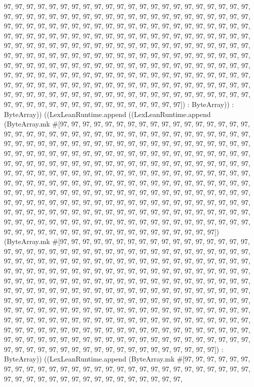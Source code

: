 \documentclass[11pt]{article}
\begin{document}
97, 97, 97, 97, 97, 97, 97, 97, 97, 97, 97, 97, 97, 97, 97, 97, 97, 97, 97, 97, 97, 97, 97, 97, 97, 97, 97, 97, 97, 97, 97, 97, 97, 97, 97, 97, 97, 97, 97, 97, 97, 97, 97, 97, 97, 97, 97, 97, 97, 97, 97, 97, 97, 97, 97, 97, 97, 97, 97, 97, 97, 97, 97, 97, 97, 97, 97, 97, 97, 97, 97, 97, 97, 97, 97, 97, 97, 97, 97, 97, 97, 97, 97, 97, 97, 97, 97, 97, 97, 97, 97, 97, 97, 97, 97, 97, 97, 97, 97, 97, 97, 97, 97, 97, 97, 97, 97, 97, 97, 97, 97, 97, 97, 97, 97, 97, 97, 97, 97, 97, 97, 97, 97, 97, 97, 97, 97, 97, 97, 97, 97, 97, 97, 97, 97, 97, 97, 97, 97, 97, 97, 97, 97, 97, 97, 97, 97, 97, 97, 97, 97, 97, 97, 97, 97, 97, 97, 97, 97, 97, 97, 97, 97, 97, 97, 97, 97, 97, 97, 97, 97, 97, 97, 97, 97, 97, 97, 97, 97, 97, 97, 97, 97, 97, 97, 97, 97, 97, 97, 97, 97, 97, 97, 97, 97, 97, 97, 97, 97, 97, 97, 97, 97, 97, 97, 97, 97, 97, 97, 97, 97, 97, 97, 97, 97, 97, 97, 97, 97, 97, 97, 97, 97, 97, 97, 97, 97, 97, 97, 97, 97, 97, 97, 97, 97, 97]) : ByteArray)) : ByteArray)) ((LexLeanRuntime.append ((LexLeanRuntime.append (ByteArray.mk \#[97, 97, 97, 97, 97, 97, 97, 97, 97, 97, 97, 97, 97, 97, 97, 97, 97, 97, 97, 97, 97, 97, 97, 97, 97, 97, 97, 97, 97, 97, 97, 97, 97, 97, 97, 97, 97, 97, 97, 97, 97, 97, 97, 97, 97, 97, 97, 97, 97, 97, 97, 97, 97, 97, 97, 97, 97, 97, 97, 97, 97, 97, 97, 97, 97, 97, 97, 97, 97, 97, 97, 97, 97, 97, 97, 97, 97, 97, 97, 97, 97, 97, 97, 97, 97, 97, 97, 97, 97, 97, 97, 97, 97, 97, 97, 97, 97, 97, 97, 97, 97, 97, 97, 97, 97, 97, 97, 97, 97, 97, 97, 97, 97, 97, 97, 97, 97, 97, 97, 97, 97, 97, 97, 97, 97, 97, 97, 97, 97, 97, 97, 97, 97, 97, 97, 97, 97, 97, 97, 97, 97, 97, 97, 97, 97, 97, 97, 97, 97, 97, 97, 97, 97, 97, 97, 97, 97, 97, 97, 97, 97, 97, 97, 97, 97, 97, 97, 97, 97, 97, 97, 97, 97, 97, 97, 97, 97, 97, 97, 97, 97, 97, 97, 97, 97, 97, 97, 97, 97, 97, 97, 97, 97, 97, 97, 97, 97, 97, 97, 97, 97, 97, 97, 97, 97, 97, 97, 97, 97, 97, 97, 97, 97, 97, 97, 97, 97, 97, 97, 97, 97, 97, 97, 97, 97, 97, 97, 97, 97, 97, 97, 97, 97, 97, 97, 97, 97, 97, 97, 97, 97, 97, 97, 97, 97, 97, 97, 97, 97, 97, 97, 97, 97, 97, 97, 97]) (ByteArray.mk \#[97, 97, 97, 97, 97, 97, 97, 97, 97, 97, 97, 97, 97, 97, 97, 97, 97, 97, 97, 97, 97, 97, 97, 97, 97, 97, 97, 97, 97, 97, 97, 97, 97, 97, 97, 97, 97, 97, 97, 97, 97, 97, 97, 97, 97, 97, 97, 97, 97, 97, 97, 97, 97, 97, 97, 97, 97, 97, 97, 97, 97, 97, 97, 97, 97, 97, 97, 97, 97, 97, 97, 97, 97, 97, 97, 97, 97, 97, 97, 97, 97, 97, 97, 97, 97, 97, 97, 97, 97, 97, 97, 97, 97, 97, 97, 97, 97, 97, 97, 97, 97, 97, 97, 97, 97, 97, 97, 97, 97, 97, 97, 97, 97, 97, 97, 97, 97, 97, 97, 97, 97, 97, 97, 97, 97, 97, 97, 97, 97, 97, 97, 97, 97, 97, 97, 97, 97, 97, 97, 97, 97, 97, 97, 97, 97, 97, 97, 97, 97, 97, 97, 97, 97, 97, 97, 97, 97, 97, 97, 97, 97, 97, 97, 97, 97, 97, 97, 97, 97, 97, 97, 97, 97, 97, 97, 97, 97, 97, 97, 97, 97, 97, 97, 97, 97, 97, 97, 97, 97, 97, 97, 97, 97, 97, 97, 97, 97, 97, 97, 97, 97, 97, 97, 97, 97, 97, 97, 97, 97, 97, 97, 97, 97, 97, 97, 97, 97, 97, 97, 97, 97, 97, 97, 97, 97, 97, 97, 97, 97, 97, 97, 97, 97, 97, 97, 97, 97, 97, 97, 97, 97, 97, 97, 97, 97, 97, 97, 97, 97, 97, 97, 97, 97, 97, 97, 97]) : ByteArray)) ((LexLeanRuntime.append (ByteArray.mk \#[97, 97, 97, 97, 97, 97, 97, 97, 97, 97, 97, 97, 97, 97, 97, 97, 97, 97, 97, 97, 97, 97, 97, 97, 97, 97, 97, 97, 97, 97, 97, 97, 97, 97, 97, 97, 97, 97, 97, 97, 97, 97, 97, 97, 
\end{document}
